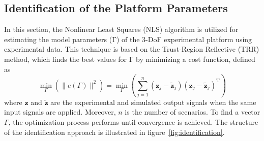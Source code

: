 \documentclass[3p]{elsarticle}
\begin{document}
\subsection{Identification of the Platform Parameters}
\noindent In this section, the Nonlinear Least Squares (NLS) algorithm is utilized for estimating the model parameters ($\boldsymbol{\mathrm{\Gamma}}$) of the 3-DoF experimental platform using experimental data.
This technique is based on the Trust-Region Reflective (TRR) method, which finds the best values for $\boldsymbol{\mathrm{\Gamma}}$ by minimizing a cost function, defined as
\begin{equation}
    \min_{\Gamma}\left(\parallel e(\Gamma) \parallel^2\right) = 
    \min_{\Gamma} \left(\sum_{j=1}^{n}(\boldsymbol{z}_j- \tilde{\boldsymbol{z}}_j)(\boldsymbol{z}_j- \tilde{\boldsymbol{z}}_j)^\mathrm{T}\right)
\end{equation} %
where $\boldsymbol{z}$ and $\tilde{\boldsymbol{z}}$ are the experimental and simulated output signals when the same input signals are applied.
Moreover, $n$ is the number of scenarios.
To find a vector $\Gamma$, the optimization process performs until convergence is achieved. %
The structure of the identification approach is illustrated in figure~\ref{fig:identification}.
\end{document}
